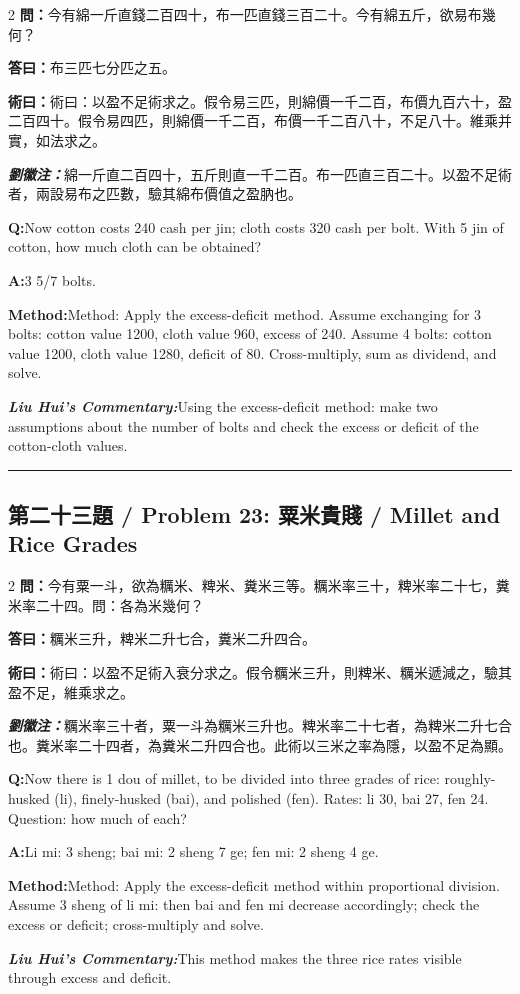 \documentclass[11pt,a4paper]{article}
\newcommand{\cnwen}{\textcolor{cnlabelfg}{\textbf{問：}}}
\newcommand{\cnda}{\textbf{答曰：}}
\newcommand{\cnshu}{\textcolor{cnlabelfg}{\textbf{術曰：}}}
\newcommand{\cnzhu}{\textcolor{commentarycolor}{\textit{\textbf{劉徽注：}}}}
\newcommand{\enwen}{\textcolor{enlabelfg}{\textbf{Q:}}}
\newcommand{\enda}{\textcolor{enlabelfg}{\textbf{A:}}}
\newcommand{\enshu}{\textcolor{enlabelfg}{\textbf{Method:}}}
\newcommand{\enzhu}{\textcolor{enlabelfg}{\textit{\textbf{Liu Hui's Commentary:}}}}
\begin{document}
\begin{paracol}{2}
\switchcolumn[0]
\cnwen 今有綿一斤直錢二百四十，布一匹直錢三百二十。今有綿五斤，欲易布幾何？

\cnda 布三匹七分匹之五。

\cnshu 術曰：以盈不足術求之。假令易三匹，則綿價一千二百，布價九百六十，盈二百四十。假令易四匹，則綿價一千二百，布價一千二百八十，不足八十。維乘并實，如法求之。

\cnzhu 綿一斤直二百四十，五斤則直一千二百。布一匹直三百二十。以盈不足術者，兩設易布之匹數，驗其綿布價值之盈肭也。

\switchcolumn[1]
\enwen Now cotton costs 240 cash per jin; cloth costs 320 cash per bolt. With 5 jin of cotton, how much cloth can be obtained?

\enda 3 5/7 bolts.

\enshu Method: Apply the excess-deficit method. Assume exchanging for 3 bolts: cotton value 1200, cloth value 960, excess of 240. Assume 4 bolts: cotton value 1200, cloth value 1280, deficit of 80. Cross-multiply, sum as dividend, and solve.

\enzhu Using the excess-deficit method: make two assumptions about the number of bolts and check the excess or deficit of the cotton-cloth values.
\end{paracol}

\bigskip\hrule\bigskip

\subsection{第二十三題 / Problem 23: 粟米貴賤 / Millet and Rice Grades}

\begin{paracol}{2}
\switchcolumn[0]
\cnwen 今有粟一斗，欲為糲米、粺米、糞米三等。糲米率三十，粺米率二十七，糞米率二十四。問：各為米幾何？

\cnda 糲米三升，粺米二升七合，糞米二升四合。

\cnshu 術曰：以盈不足術入衰分求之。假令糲米三升，則粺米、糲米遞減之，驗其盈不足，維乘求之。

\cnzhu 糲米率三十者，粟一斗為糲米三升也。粺米率二十七者，為粺米二升七合也。糞米率二十四者，為糞米二升四合也。此術以三米之率為隱，以盈不足為顯。

\switchcolumn[1]
\enwen Now there is 1 dou of millet, to be divided into three grades of rice: roughly-husked (li), finely-husked (bai), and polished (fen). Rates: li 30, bai 27, fen 24. Question: how much of each?

\enda Li mi: 3 sheng; bai mi: 2 sheng 7 ge; fen mi: 2 sheng 4 ge.

\enshu Method: Apply the excess-deficit method within proportional division. Assume 3 sheng of li mi: then bai and fen mi decrease accordingly; check the excess or deficit; cross-multiply and solve.

\enzhu This method makes the three rice rates visible through excess and deficit.
\end{paracol}
\end{document}
